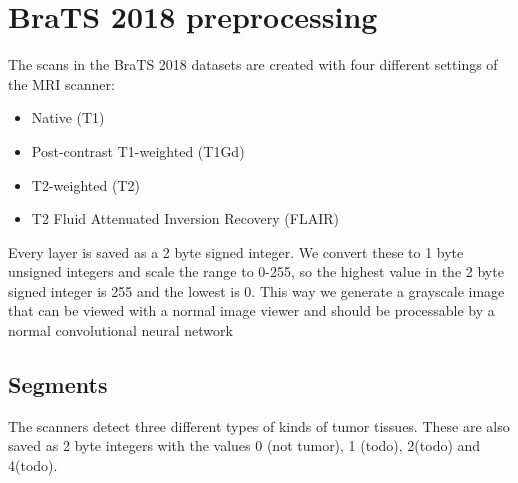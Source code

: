 \chapter{BraTS 2018 preprocessing}
The scans in the BraTS 2018 datasets are created with four different settings of the MRI scanner:

\begin{itemize}
    \item Native (T1)
    \item Post-contrast T1-weighted (T1Gd)
    \item T2-weighted (T2)
    \item T2 Fluid Attenuated Inversion Recovery (FLAIR)
\end{itemize}

Every layer is saved as a 2 byte signed integer. We convert these to 1 byte unsigned integers and scale the range to 0-255, so the highest value in the 2 byte signed integer is 255 and the lowest is 0.
This way we generate a grayscale image that can be viewed with a normal image viewer and should be processable by a normal convolutional neural network

\section{Segments}
The scanners detect three different types of kinds of tumor tissues. These are also saved as 2 byte integers with the values 0 (not tumor), 1 (todo), 2(todo) and 4(todo).